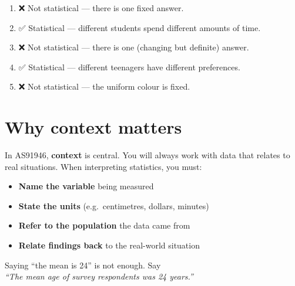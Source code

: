 \documentclass[
  11pt,
  a4paper,
  oneside,
  open=any]{scrbook}
\providecommand{\tightlist}{%
  \setlength{\itemsep}{0pt}\setlength{\parskip}{0pt}}
\begin{document}
\begin{tcolorbox}[enhanced jigsaw, breakable, leftrule=.75mm, bottomtitle=1mm, bottomrule=.15mm, titlerule=0mm, left=2mm, opacitybacktitle=0.6, coltitle=black, colbacktitle=quarto-callout-note-color!10!white, rightrule=.15mm, title=\textcolor{quarto-callout-note-color}{\faInfo}\hspace{0.5em}{Answers}, toptitle=1mm, arc=.35mm, colback=white, toprule=.15mm, colframe=quarto-callout-note-color-frame, opacityback=0]

\begin{enumerate}
\def\labelenumi{\arabic{enumi}.}
\tightlist
\item
  ❌ Not statistical --- there is one fixed answer.
\item
  ✅ Statistical --- different students spend different amounts of time.
\item
  ❌ Not statistical --- there is one (changing but definite) answer.
\item
  ✅ Statistical --- different teenagers have different preferences.
\item
  ❌ Not statistical --- the uniform colour is fixed.
\end{enumerate}

\end{tcolorbox}

\section{Why context matters}\label{why-context-matters}

In AS91946, \textbf{context} is central. You will always work with data
that relates to real situations. When interpreting statistics, you must:

\begin{itemize}
\tightlist
\item
  \textbf{Name the variable} being measured
\item
  \textbf{State the units} (e.g.~centimetres, dollars, minutes)
\item
  \textbf{Refer to the population} the data came from
\item
  \textbf{Relate findings back} to the real-world situation
\end{itemize}

\begin{tcolorbox}[enhanced jigsaw, breakable, leftrule=.75mm, bottomtitle=1mm, bottomrule=.15mm, titlerule=0mm, left=2mm, opacitybacktitle=0.6, coltitle=black, colbacktitle=quarto-callout-warning-color!10!white, rightrule=.15mm, title=\textcolor{quarto-callout-warning-color}{\faExclamationTriangle}\hspace{0.5em}{Common mistake}, toptitle=1mm, arc=.35mm, colback=white, toprule=.15mm, colframe=quarto-callout-warning-color-frame, opacityback=0]

Saying ``the mean is 24'' is not enough. Say\\
\emph{``The mean age of survey respondents was 24 years.''}

\end{tcolorbox}
\end{document}
